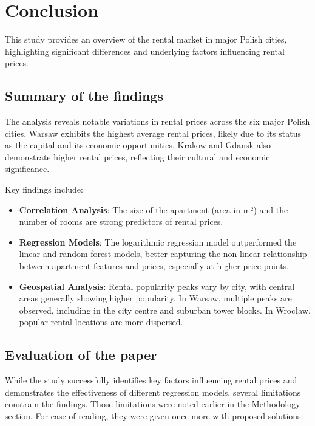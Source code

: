 \section{Conclusion}
This study provides an overview of the rental market in major Polish cities, highlighting significant differences and underlying factors influencing rental prices.

\subsection{Summary of the findings}
The analysis reveals notable variations in rental prices across the six major Polish cities. Warsaw exhibits the highest average rental prices, likely due to its status as the capital and its economic opportunities. Krakow and Gdansk also demonstrate higher rental prices, reflecting their cultural and economic significance.

Key findings include:
\begin{itemize}
    \item \textbf{Correlation Analysis}: The size of the apartment (area in m²) and the number of rooms are strong predictors of rental prices.
    \item \textbf{Regression Models}: The logarithmic regression model outperformed the linear and random forest models, better capturing the non-linear relationship between apartment features and prices, especially at higher price points.
    \item \textbf{Geospatial Analysis}: Rental popularity peaks vary by city, with central areas generally showing higher popularity. In Warsaw, multiple peaks are observed, including in the city centre and suburban tower blocks. In Wrocław, popular rental locations are more dispersed.
\end{itemize}

\subsection{Evaluation of the paper}
While the study successfully identifies key factors influencing rental prices and demonstrates the effectiveness of different regression models, several limitations constrain the findings. Those limitations were noted earlier in the Methodology section. For ease of reading, they were given once more with proposed solutions:

